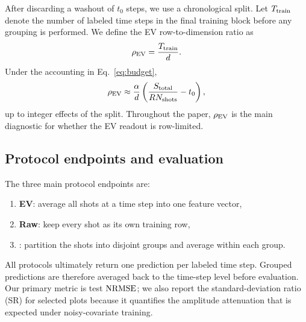 After discarding a washout of $t_0$ steps, we use a chronological split. Let $T_{\mathrm{train}}$ denote the number of labeled time steps in the final training block before any grouping is performed. We define the EV row-to-dimension ratio as
\begin{equation}
\rho_{\mathrm{EV}} = \frac{T_{\mathrm{train}}}{d}.
\label{eq:rhoev}
\end{equation}
Under the accounting in Eq.~\eqref{eq:budget},
\begin{equation}
\rho_{\mathrm{EV}} \approx \frac{\alpha}{d}\left(\frac{S_{\mathrm{total}}}{R N_{\mathrm{shots}}}-t_0\right),
\label{eq:rhoevbudget}
\end{equation}
up to integer effects of the split. Throughout the paper, $\rho_{\mathrm{EV}}$ is the main diagnostic for whether the EV readout is row-limited.

\subsection{Protocol endpoints and evaluation}

The three main protocol endpoints are:
\begin{enumerate}[leftmargin=*,label=(\alph*)]
    \item \textbf{EV}: average all shots at a time step into one feature vector,
    \item \textbf{Raw}: keep every shot as its own training row,
    \item \textbf{\Split{}}: partition the shots into disjoint groups and average within each group.
\end{enumerate}

All protocols ultimately return one prediction per labeled time step. Grouped predictions are therefore averaged back to the time-step level before evaluation. Our primary metric is test $\mathrm{NRMSE}$; we also report the standard-deviation ratio (SR) for selected plots because it quantifies the amplitude attenuation that is expected under noisy-covariate training.
